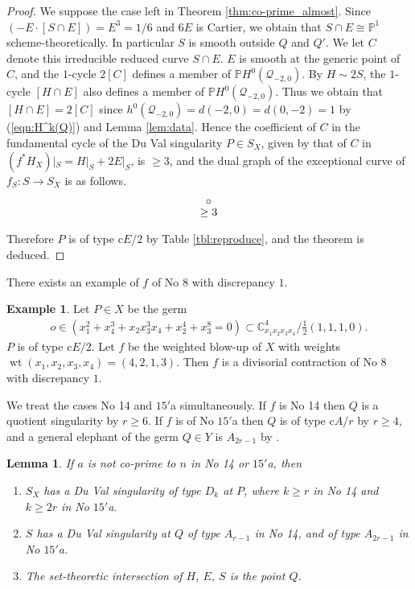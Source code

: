 \documentclass[a4paper,11pt]{amsart}
\newtheorem{lemma}[theorem]{Lemma}
\theoremstyle{definition}
\newtheorem{example}[theorem]{Example}
\theoremstyle{remark}
\numberwithin{equation}{section}
\newcommand{\bC}{{\mathbb C}}
\newcommand{\bP}{{\mathbb P}}
\newcommand{\cQ}{{\mathcal Q}}
\newcommand{\wt}{\operatorname{wt}}
\begin{document}
\begin{proof}
We suppose the case left in Theorem \ref{thm:co-prime_almost}.
Since $(-E \cdot [S \cap E])=E^3=1/6$ and $6E$ is Cartier,
we obtain that $S \cap E \cong \bP^1$ scheme-theoretically.
In particular $S$ is smooth outside $Q$ and $Q'$.
We let $C$ denote this irreducible reduced curve $S \cap E$.
$E$ is smooth at the generic point of $C$,
and the $1$-cycle $2[C]$ defines a member of $\bP H^0(\cQ_{-2,0})$.
By $H \sim 2S$,
the $1$-cycle $[H \cap E]$ also defines a member of $\bP H^0(\cQ_{-2,0})$.
Thus we obtain that $[H \cap E]=2[C]$
since $h^0(\cQ_{-2,0})=d(-2,0)=d(0,-2)=1$ by
(\ref{eqn:H^k(Q)}) and Lemma \ref{lem:data}.
Hence the coefficient of $C$ in the fundamental cycle
of the Du Val singularity $P \in S_X$,
given by that of $C$ in $(f^*H_X)|_S= H|_S+2E|_S$,
is $\ge3$,
and the dual graph of the exceptional curve of $f_S \colon S \to S_X$
is as follows.
\begin{align*}
\xymatrix@!0@=30pt{
&
*=<3.5pt>{\circ} \ar@{}[r]_<*+{\!\!\ge3} &
}
\end{align*}
Therefore $P$ is of type c$E/2$ by Table \ref{tbl:reproduce},
and the theorem is deduced.
\end{proof}

There exists an example of $f$ of No 8 with discrepancy $1$.

\begin{example}\label{exl:cE/2}
Let $P \in X$ be the germ
\begin{align*}
o \in (x_1^2+x_4^3+x_2x_3^3x_4+x_2^4+x_3^8=0) 
\subset \bC^4_{x_1x_2x_3x_4} /\frac{1}{2}(1,1,1,0).
\end{align*}
$P$ is of type c$E/2$.
Let $f$ be the weighted blow-up of $X$
with weights $\wt(x_1,x_2,x_3,x_4)=(4,2,1,3)$.
Then $f$ is a divisorial contraction of No 8 with discrepancy $1$.
\end{example}

We treat the cases No 14 and $\textrm{15}'$a simultaneously.
If $f$ is No 14 then $Q$ is a quotient singularity by $r\ge6$.
If $f$ is of No $\textrm{15}'$a then $Q$ is of type c$A/r$ by $r\ge4$,
and a general elephant of the germ $Q \in Y$ is $A_{2r-1}$ by \cite{Mo85}.

\begin{lemma}\label{lem:D_14/15}
If $a$ is not co-prime to $n$ in No 14 or $\textrm{15}'$a,
then
\begin{enumerate}
\item\label{itm:D_14/15-D}
$S_X$ has a Du Val singularity of type $D_k$ at $P$,
where $k\ge r$ in No 14 and $k \ge 2r$ in No $\textrm{15}'$a.
\item\label{itm:D_14/15-A}
$S$ has a Du Val singularity at $Q$ of type $A_{r-1}$ in No 14,
and of type $A_{2r-1}$ in No $\textrm{15}'$a.
\item\label{itm:D_14/15-proper}
The set-theoretic intersection of $H$, $E$, $S$ is the point $Q$.
\end{enumerate}
\end{lemma}
\end{document}
